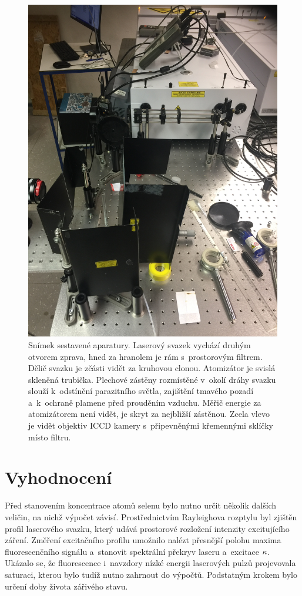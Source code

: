 \begin{figure}[htp]
	\centering
	\includegraphics[width=\textwidth, trim={0 24 0 0}, clip]
		{img/lif-setup-photo-1}
	\caption{Snímek sestavené aparatury.
		Laserový svazek vychází druhým otvorem zprava,
		hned za hranolem je rám s~prostorovým filtrem.
		Dělič svazku je zčásti vidět za kruhovou clonou.
		Atomizátor je svislá skleněná trubička.
		Plechové zástěny rozmístěné v~okolí dráhy svazku
		slouží k~odstínění parazitního světla,
		zajištění tmavého pozadí a~k~ochraně plamene před prouděním vzduchu.
		Měřič energie za atomizátorem není vidět, je skryt za nejbližší
		zástěnou.
		Zcela vlevo je vidět objektiv ICCD kamery s~připevněnými
		křemennými sklíčky místo filtru.}%
	\label{fig:lif-setup-photo}
\end{figure}

\section{Vyhodnocení}
\label{sec:lif-method}

Před stanovením koncentrace atomů selenu bylo nutno určit několik
dalších veličin, na nichž výpočet závisí.
Prostřednictvím Rayleighova rozptylu byl zjištěn profil laserového svazku,
který udává prostorové rozložení intenzity excitujícího záření.
Změření excitačního profilu umožnilo nalézt přesnější polohu maxima
fluorescenčního signálu
a~stanovit spektrální překryv laseru a~excitace $\kappa$.
Ukázalo se, že fluorescence i~navzdory nízké energii laserových pulzů
projevovala saturaci, kterou bylo tudíž nutno zahrnout do výpočtů.
Podstatným krokem bylo určení doby života zářivého stavu.

